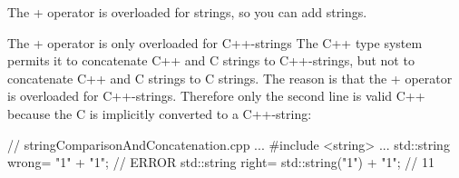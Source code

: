 The + operator is overloaded for strings, so you can add strings.

\begin{myWarning}{The + operator is only overloaded for C++-strings}
The C++ type system permits it to concatenate C++ and C strings to C++-strings, but not to concatenate C++ and C strings to C strings. The reason is that the + operator is overloaded for C++-strings. Therefore only the second line is valid C++ because the C is implicitly converted to a C++-string:
	

\begin{cpp}
// stringComparisonAndConcatenation.cpp
...
#include <string>
...
std::string wrong= "1" + "1"; // ERROR
std::string right= std::string("1") + "1"; // 11
\end{cpp}
\end{myWarning}








